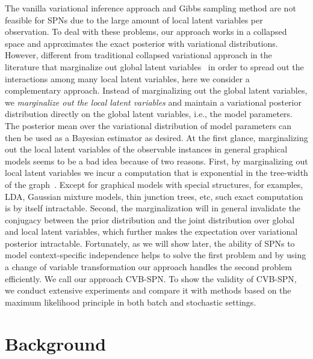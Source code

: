 \documentclass{article} %
\theoremstyle{definition}
\begin{document}
The vanilla variational inference approach and Gibbs sampling method are not feasible for SPNs due to the large amount of local latent variables per observation. To deal with these problems, our approach works in a collapsed space and approximates the exact posterior with variational distributions. However, different from traditional collapsed variational approach in the literature that marginalize out global latent variables~\cite{teh2006collapsed,teh2007collapsed} in order to spread out the interactions among many local latent variables, here we consider a complementary approach. Instead of marginalizing out the global latent variables, we \emph{marginalize out the local latent variables} and maintain a variational posterior distribution directly on the global latent variables, i.e., the model parameters. The posterior mean over the variational distribution of model parameters can then be used as a Bayesian estimator as desired. At the first glance, marginalizing out the local latent variables of the observable instances in general graphical models seems to be a bad idea because of two reasons. First, by marginalizing out local latent variables we incur a computation that is exponential in the tree-width of the graph~\cite{wainwright2008graphical}. Except for graphical models with special structures, for examples, LDA, Gaussian mixture models, thin junction trees, etc, such exact computation is by itself intractable. Second, the marginalization will in general invalidate the conjugacy between the prior distribution and the joint distribution over global and local latent variables, which further makes the expectation over variational posterior intractable. Fortunately, as we will show later, the ability of SPNs to model context-specific independence helps to solve the first problem and by using a change of variable transformation our approach handles the second problem efficiently. We call our approach CVB-SPN. To show the validity of CVB-SPN, we conduct extensive experiments and compare it with methods based on the maximum likelihood principle in both batch and stochastic settings.

\section{Background}
\label{sec:background}
\end{document}
